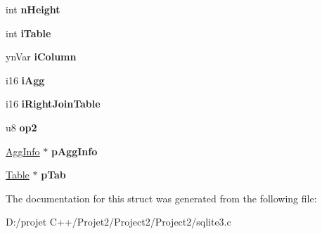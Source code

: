 \begin{DoxyCompactItemize}
\begin{tabbing}
\end{tabbing}\item 
\mbox{\label{struct_expr_a5a893ea309f801f23404e7e5ac02732b}} 
int {\bfseries n\+Height}
\item 
\mbox{\label{struct_expr_af8e273f4d7d173bfb5996ed09054611c}} 
int {\bfseries i\+Table}
\item 
\mbox{\label{struct_expr_ad19251a8eb6db3cf0bdffe0dcb07eeba}} 
yn\+Var {\bfseries i\+Column}
\item 
\mbox{\label{struct_expr_a9fe0ed6360b0a4cf5b67ab8def922033}} 
i16 {\bfseries i\+Agg}
\item 
\mbox{\label{struct_expr_aa49b76f3628a7bf2b0997c33461cc651}} 
i16 {\bfseries i\+Right\+Join\+Table}
\item 
\mbox{\label{struct_expr_a0eacba0a2a6977e434b096b1cb9d5b9e}} 
u8 {\bfseries op2}
\item 
\mbox{\label{struct_expr_a4fde82477256ee85f3a906263549082a}} 
\mbox{\hyperlink{struct_agg_info}{Agg\+Info}} $\ast$ {\bfseries p\+Agg\+Info}
\item 
\mbox{\label{struct_expr_a27c8824b41d853eeeebe61cf3ac1ae5a}} 
\mbox{\hyperlink{struct_table}{Table}} $\ast$ {\bfseries p\+Tab}
\end{DoxyCompactItemize}


The documentation for this struct was generated from the following file\+:\begin{DoxyCompactItemize}
\item 
D\+:/projet C++/\+Projet2/\+Project2/\+Project2/sqlite3.\+c\end{DoxyCompactItemize}
